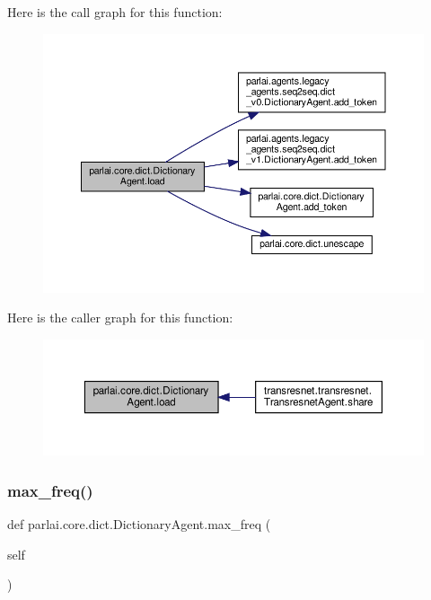 Here is the call graph for this function\+:
\nopagebreak
\begin{figure}[H]
\begin{center}
\leavevmode
\includegraphics[width=350pt]{classparlai_1_1core_1_1dict_1_1DictionaryAgent_aa4229d1ba17932f588e15067afd9bf42_cgraph}
\end{center}
\end{figure}
Here is the caller graph for this function\+:
\nopagebreak
\begin{figure}[H]
\begin{center}
\leavevmode
\includegraphics[width=350pt]{classparlai_1_1core_1_1dict_1_1DictionaryAgent_aa4229d1ba17932f588e15067afd9bf42_icgraph}
\end{center}
\end{figure}
\mbox{\label{classparlai_1_1core_1_1dict_1_1DictionaryAgent_a3c3ef6181e0cea58b2650af763db1d17}} 
\subsubsection{\texorpdfstring{max\+\_\+freq()}{max\_freq()}}
{\footnotesize\ttfamily def parlai.\+core.\+dict.\+Dictionary\+Agent.\+max\+\_\+freq (\begin{DoxyParamCaption}\item[{}]{self }\end{DoxyParamCaption})}

